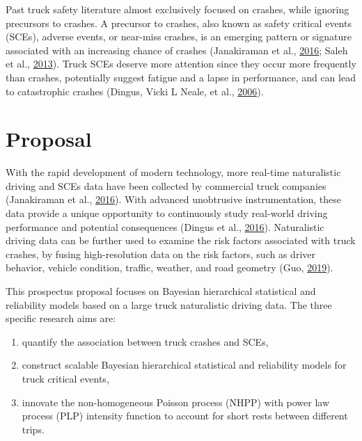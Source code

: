 \documentclass[12pt]{book}
\numberwithin{equation}{chapter}
\providecommand{\tightlist}{%
  \setlength{\itemsep}{0pt}\setlength{\parskip}{0pt}}
\begin{document}
Past truck safety literature almost exclusively focused on crashes, while ignoring precursors to crashes. A precursor to crashes, also known as safety critical events (SCEs), adverse events, or near-miss crashes, is an emerging pattern or signature associated with an increasing chance of crashes (Janakiraman et al., \protect\hyperlink{ref-janakiraman2016discovery}{2016}; Saleh et al., \protect\hyperlink{ref-saleh2013accident}{2013}). Truck SCEs deserve more attention since they occur more frequently than crashes, potentially suggest fatigue and a lapse in performance, and can lead to catastrophic crashes (Dingus, Vicki L Neale, et al., \protect\hyperlink{ref-dingus2006development}{2006}).

\hypertarget{proposal}{%
\section{Proposal}\label{proposal}}

With the rapid development of modern technology, more real-time naturalistic driving and SCEs data have been collected by commercial truck companies (Janakiraman et al., \protect\hyperlink{ref-janakiraman2016discovery}{2016}). With advanced unobtrusive instrumentation, these data provide a unique opportunity to continuously study real-world driving performance and potential consequences (Dingus et al., \protect\hyperlink{ref-dingus2016driver}{2016}). Naturalistic driving data can be further used to examine the risk factors associated with truck crashes, by fusing high-resolution data on the risk factors, such as driver behavior, vehicle condition, traffic, weather, and road geometry (Guo, \protect\hyperlink{ref-guo2019statistical}{2019}).

This prospectus proposal focuses on Bayesian hierarchical statistical and reliability models based on a large truck naturalistic driving data. The three specific research aims are:

\begin{enumerate}
\def\labelenumi{\arabic{enumi})}
\tightlist
\item
  quantify the association between truck crashes and SCEs,
\item
  construct scalable Bayesian hierarchical statistical and reliability models for truck critical events,
\item
  innovate the non-homogeneous Poisson process (NHPP) with power law process (PLP) intensity function to account for short rests between different trips.
\end{enumerate}
\end{document}
